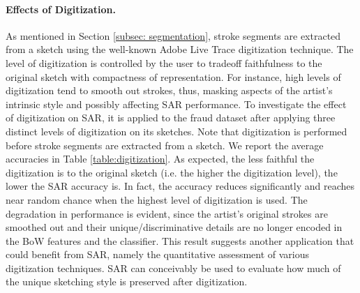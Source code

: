 

\vspace{-3mm}
\paragraph{Effects of Digitization.} As mentioned in Section \ref{subsec: segmentation}, stroke segments are extracted from a sketch using the well-known Adobe Live Trace digitization technique. The level of digitization is controlled by the user to tradeoff faithfulness to the original sketch with compactness of representation. For instance, high levels of digitization tend to smooth out strokes, thus, masking aspects of the artist's intrinsic style and possibly affecting SAR performance. To investigate the effect of digitization on SAR, it is applied to the fraud dataset after applying three distinct levels of digitization on its sketches. Note that digitization is performed before stroke segments are extracted from a sketch. We report the average accuracies in Table \ref{table:digitization}. As expected, the less faithful the digitization is to the original sketch (i.e. the higher the digitization level), the lower the SAR accuracy is. In fact, the accuracy reduces significantly and reaches near random chance when the highest level of digitization is used. The degradation in performance is evident, since the artist's original strokes are smoothed out and their unique/discriminative details are no longer encoded in the BoW features and the classifier. This result suggests another application that could benefit from SAR, namely the quantitative assessment of various digitization techniques. SAR can conceivably be used to evaluate how much of the unique sketching style is preserved after digitization.


